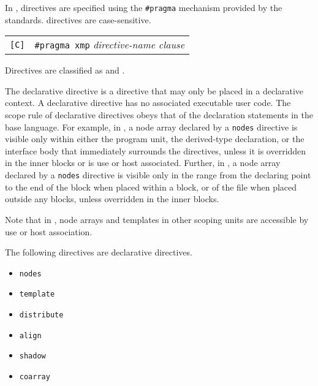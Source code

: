 \vspace{0.5cm}

In {\XMPC}, {\XMP} directives are specified using the \verb|#pragma|
mechanism provided by the {\C} standards. {\XMPC} directives are
case-sensitive.

\vspace{0.5cm}

\begin{tabular}{ll}
\verb![C]! & \verb|#pragma xmp| {\it directive-name clause} \\
\end{tabular}

\vspace{0.5cm}


Directives are classified as {\it {}} and
{\it {}}.

The declarative directive is a directive that may only be
placed in a declarative context. A declarative directive has no
associated executable user code. The scope rule of declarative
directives obeys that of the declaration statements in the base
language.
%
For example, in {\XMPF}, a node array declared by a {\tt nodes}
directive is visible only within either the program unit, the
derived-type declaration, or the interface body that immediately
surrounds the directives, unless it is overridden in the inner blocks or
is use or host associated.
%
Further, in {\XMPC}, a node array declared by a {\tt nodes} directive is
visible only in the range from the declaring point to the end of 
the block when placed within a block, or of the file when
placed outside any blocks, unless overridden in the inner blocks.

Note that in {\XMPF}, node arrays and templates in other scoping units
are accessible by use or host association.

The following directives are declarative directives.

\begin{itemize}
 \item {\tt nodes}
 \item {\tt template}
 \item {\tt distribute}
 \item {\tt align}
 \item {\tt shadow}
 \item {\tt coarray}
\end{itemize}

